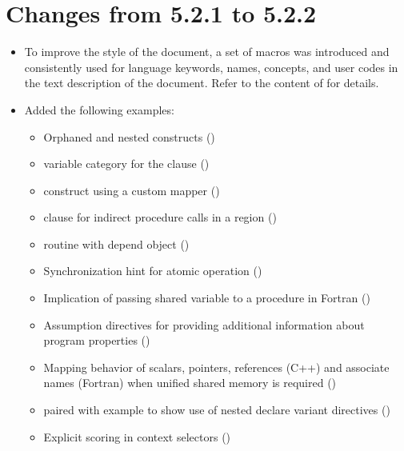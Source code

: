 \label{chap:history}

\section{Changes from 5.2.1 to 5.2.2}
\label{sec:history_521_to_522}

\begin{itemize}
\item To improve the style of the document, a set of macros was introduced
  and consistently used for language keywords, names, concepts, and user codes
  in the text description of the document.  Refer to the content of 
  for details.

\item Added the following examples:
\begin{itemize}
  \item Orphaned and nested  constructs ()
  \item {} variable category for the  clause
    ()
  \item {} construct using a custom mapper
    ()
  \item {} clause for indirect procedure calls in a
     region ()
  \item {} routine with depend object
    ()
  \item Synchronization hint for atomic operation ()
  \item Implication of passing shared variable to a procedure
    in Fortran ()
  \item Assumption directives for providing additional information
    about program properties ()
  \item Mapping behavior of scalars, pointers, references (C++) and associate names
        (Fortran) when unified shared memory is required
    ()
  \item {} paired with 
    example to show use of nested declare variant 
    directives ()
  \item Explicit scoring in context selectors
    ()
\end{itemize}


\end{itemize}
